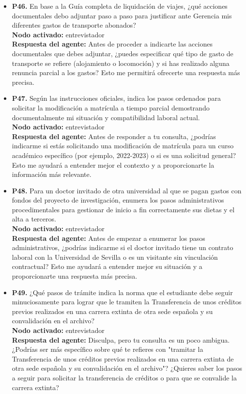 \documentclass{article}
\begin{document}
\begin{itemize}
      \item \textbf{P46.} En base a la Guía completa de liquidación de viajes, ¿qué acciones documentales debo adjuntar paso a paso para justificar ante Gerencia mis diferentes gastos de transporte abonados? \\
            \textbf{Nodo activado:} entrevistador \\
            \textbf{Respuesta del agente:} Antes de proceder a indicarte las acciones documentales que debes adjuntar, ¿puedes especificar qué tipo de gasto de transporte se refiere (alojamiento o locomoción) y si has realizado alguna renuncia parcial a los gastos? Esto me permitirá ofrecerte una respuesta más precisa.

      \item \textbf{P47.} Según las instrucciones oficiales, indica los pasos ordenados para solicitar la modificación a matrícula a tiempo parcial demostrando documentalmente mi situación y compatibilidad laboral actual. \\
            \textbf{Nodo activado:} entrevistador \\
            \textbf{Respuesta del agente:} Antes de responder a tu consulta, ¿podrías indicarme si estás solicitando una modificación de matrícula para un curso académico específico (por ejemplo, 2022-2023) o si es una solicitud general? Esto me ayudará a entender mejor el contexto y a proporcionarte la información más relevante.

      \item \textbf{P48.} Para un doctor invitado de otra universidad al que se pagan gastos con fondos del proyecto de investigación, enumera los pasos administrativos procedimentales para gestionar de inicio a fin correctamente sus dietas y el alta a terceros. \\
            \textbf{Nodo activado:} entrevistador \\
            \textbf{Respuesta del agente:} Antes de empezar a enumerar los pasos administrativos, ¿podrías indicarme si el doctor invitado tiene un contrato laboral con la Universidad de Sevilla o es un visitante sin vinculación contractual? Esto me ayudará a entender mejor su situación y a proporcionarte una respuesta más precisa.

      \item \textbf{P49.} ¿Qué pasos de trámite indica la norma que el estudiante debe seguir minuciosamente para lograr que le tramiten la Transferencia de unos créditos previos realizados en una carrera extinta de otra sede española y su convalidación en el archivo? \\
            \textbf{Nodo activado:} entrevistador \\
            \textbf{Respuesta del agente:} Disculpa, pero tu consulta es un poco ambigua. ¿Podrías ser más específico sobre qué te refieres con "tramitar la Transferencia de unos créditos previos realizados en una carrera extinta de otra sede española y su convalidación en el archivo"? ¿Quieres saber los pasos a seguir para solicitar la transferencia de créditos o para que se convalide la carrera extinta?


\end{itemize}
\end{document}
